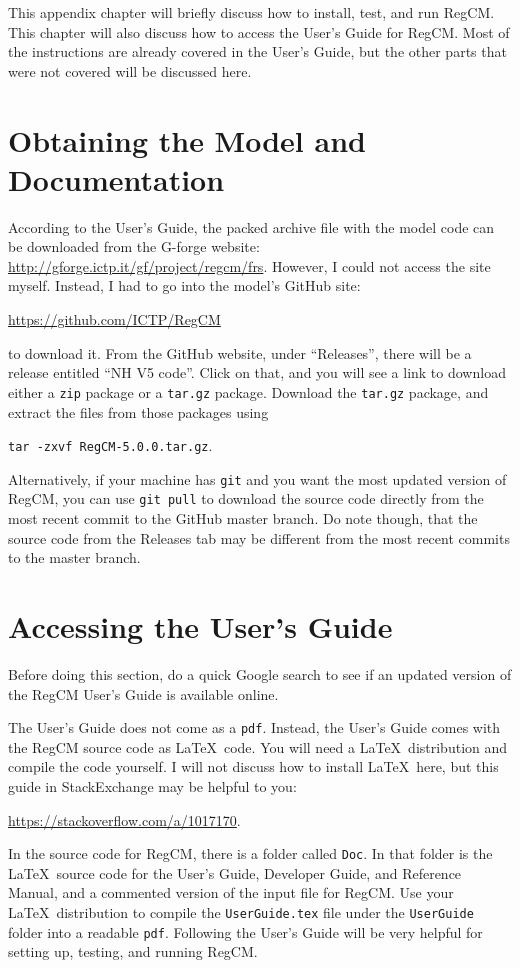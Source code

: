 This appendix chapter will briefly discuss how to install, test, and run RegCM.
This chapter will also discuss how to access the User's Guide for RegCM.
Most of the instructions are already covered in the User's Guide,
	but the other parts that were not covered will be discussed here.
	
\section{Obtaining the Model and Documentation}
	According to the User's Guide, the packed archive file with the model code can be downloaded from the G-forge website: 
		\url{http://gforge.ictp.it/gf/project/regcm/frs}.
	However, I could not access the site myself.
	Instead, I had to go into the model's GitHub site:
	\begin{center}
		\url{https://github.com/ICTP/RegCM}
	\end{center}
	to download it.
	From the GitHub website, under ``Releases'', there will be a release entitled ``NH V5 code''.
	Click on that, and you will see a link to download either a \texttt{zip} package or a \texttt{tar.gz} package.
	Download the \texttt{tar.gz} package, and extract the files from those packages using
	\begin{center}
		\texttt{tar -zxvf RegCM-5.0.0.tar.gz}.
	\end{center}
	Alternatively, if your machine has \texttt{git} and you want the most updated version of RegCM, you can use \texttt{git pull} to download the source code directly from the most recent commit to the GitHub master branch.
	Do note though, that the source code from the Releases tab may be different from the most recent commits to the master branch.

\section{Accessing the User's Guide}
	Before doing this section, do a quick Google search to see if an updated version of the RegCM User's Guide is available online.

	The User's Guide does not come as a \texttt{pdf}.
	Instead, the User's Guide comes with the RegCM source code as \LaTeX\ code.
	You will need a \LaTeX\ distribution and compile the code yourself.
	I will not discuss how to install \LaTeX\ here, but this guide in StackExchange may be helpful to you:
	\begin{center}
		\url{https://stackoverflow.com/a/1017170}.
	\end{center}

	In the source code for RegCM, there is a folder called \texttt{Doc}.
	In that folder is the \LaTeX\ source code for the User's Guide, Developer Guide, and Reference Manual, and a commented version of the input file for RegCM.
	Use your \LaTeX\ distribution to compile the \texttt{UserGuide.tex} file under the \texttt{UserGuide} folder into a readable \texttt{pdf}.
	Following the User's Guide will be very helpful for setting up, testing, and running RegCM.
	
